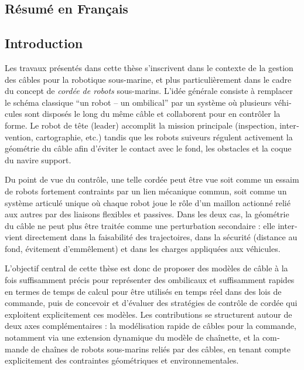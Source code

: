 \begin{otherlanguage}{french}


	\chapter{Résumé en Français}
	\label{summary_in_french}

	\minitoc{}

	\section{Introduction}
	\label{sif_introduction}

	Les travaux présentés dans cette thèse s'inscrivent dans le contexte de la gestion des câbles pour
	la robotique sous-marine, et plus particulièrement dans le cadre du concept de \emph{cordée de
		robots} sous-marins. L'idée générale consiste à remplacer le schéma classique \enquote{un robot --
		un ombilical} par un système où plusieurs véhicules sont disposés le long du même câble et
	collaborent pour en contrôler la forme. Le robot de tête (leader) accomplit la mission principale
	(inspection, intervention, cartographie, etc.) tandis que les robots suiveurs régulent activement
	la géométrie du câble afin d'éviter le contact avec le fond, les obstacles et la coque du navire
	support.

	Du point de vue du contrôle, une telle cordée peut être vue soit comme un essaim de robots
	fortement contraints par un lien mécanique commun, soit comme un système articulé unique où chaque
	robot joue le rôle d'un maillon actionné relié aux autres par des liaisons flexibles et passives.
	Dans les deux cas, la géométrie du câble ne peut plus être traitée comme une perturbation
	secondaire : elle intervient directement dans la faisabilité des trajectoires, dans la sécurité
	(distance au fond, évitement d'emmêlement) et dans les charges appliquées aux véhicules.

	L'objectif central de cette thèse est donc de proposer des modèles de câble à la fois suffisamment
	précis pour représenter des ombilicaux et suffisamment rapides en termes de temps de calcul pour
	être utilisés en temps réel dans des lois de commande, puis de concevoir et d'évaluer des
	stratégies de contrôle de cordée qui exploitent explicitement ces modèles. Les contributions se
	structurent autour de deux axes complémentaires : la modélisation rapide de câbles pour la
	commande, notamment via une extension dynamique du modèle de chaînette, et la commande de chaînes
	de robots sous-marins reliés par des câbles, en tenant compte explicitement des contraintes
	géométriques et environnementales.


\end{otherlanguage}
